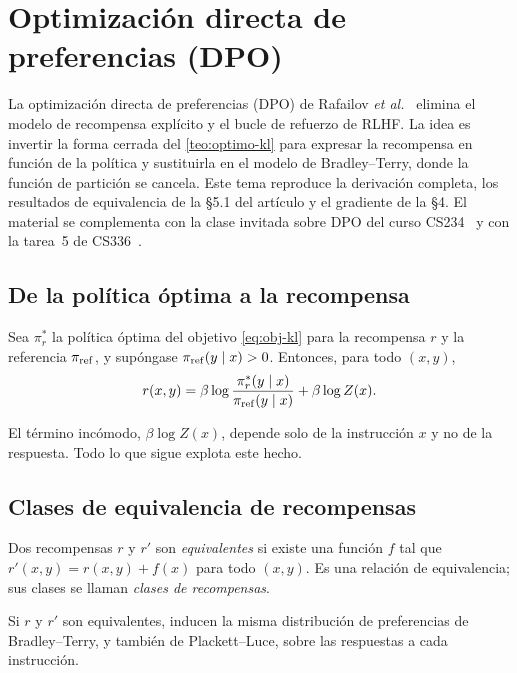 \chapter{Optimización directa de preferencias (DPO)}
\label{tema:5}

La optimización directa de preferencias (DPO) de Rafailov \emph{et al.}~\cite{dpo} elimina el modelo de recompensa explícito y el bucle de refuerzo de RLHF. La idea es invertir la forma cerrada del \cref{teo:optimo-kl} para expresar la recompensa en función de la política y sustituirla en el modelo de Bradley--Terry, donde la función de partición se cancela. Este tema reproduce la derivación completa, los resultados de equivalencia de la §5.1 del artículo y el gradiente de la §4. El material se complementa con la clase invitada sobre DPO del curso CS234~\cite{cs234} y con la tarea~5 de CS336~\cite{cs336a5s}.

\section{De la política óptima a la recompensa}

\begin{lema}[Reparametrización]\label{lem:reparam}
Sea $\pi_r^{*}$ la política óptima del objetivo \eqref{eq:obj-kl} para la recompensa $r$ y la referencia $\pi_{\mathrm{ref}}$, y supóngase $\pi_{\mathrm{ref}}(y\mid x)>0$. Entonces, para todo $(x,y)$,
\[
r(x,y)=\beta\log\frac{\pi_r^{*}(y\mid x)}{\pi_{\mathrm{ref}}(y\mid x)}+\beta\log Z(x).
\]
\end{lema}

El término incómodo, $\beta\log Z(x)$, depende solo de la instrucción $x$ y no de la respuesta. Todo lo que sigue explota este hecho.

\section{Clases de equivalencia de recompensas}

\begin{definicion}\label{def:equiv}
Dos recompensas $r$ y $r'$ son \emph{equivalentes} si existe una función $f$ tal que $r'(x,y)=r(x,y)+f(x)$ para todo $(x,y)$. Es una relación de equivalencia; sus clases se llaman \emph{clases de recompensas}.
\end{definicion}

\begin{lema}\label{lem:equiv-pref}
Si $r$ y $r'$ son equivalentes, inducen la misma distribución de preferencias de Bradley--Terry, y también de Plackett--Luce, sobre las respuestas a cada instrucción.
\end{lema}

